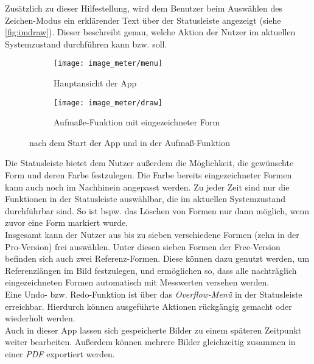 Zusätzlich zu dieser Hilfestellung, wird dem Benutzer beim Auswählen des Zeichen-Modus ein erklärender Text über der Statusleiste angezeigt (siehe \autoref{fig:imdraw}).
Dieser beschreibt genau, welche Aktion der Nutzer im aktuellen Systemzustand durchführen kann bzw. soll. \\

\begin{figure}[h]
  \centering
  \begin{subfigure}[t]{0.49\textwidth}
    \texttt{[image: image\_meter/menu]}
    \caption{Hauptansicht der App}
    \label{fig:immenu}	
  \end{subfigure}
  \begin{subfigure}[t]{0.49\textwidth}
    \texttt{[image: image\_meter/draw]}
    \caption{Aufmaße-Funktion mit eingezeichneter Form} 
    \label{fig:imdraw}	
  \end{subfigure}
  \caption{\im{} nach dem Start der App und in der Aufmaß-Funktion}
\end{figure}

\noindent
Die Statusleiste bietet dem Nutzer außerdem die Möglichkeit, die gewünschte Form und deren Farbe festzulegen.
Die Farbe bereits eingezeichneter Formen kann auch noch im Nachhinein angepasst werden.
Zu jeder Zeit sind nur die Funktionen in der Statusleiste auswählbar, die im aktuellen Systemzustand durchführbar sind.
So ist bspw. das Löschen von Formen nur dann möglich, wenn zuvor eine Form markiert wurde. \\

Insgesamt kann der Nutzer aus bis zu sieben verschiedene Formen (zehn in der Pro-Version) frei auswählen.
Unter diesen sieben Formen der Free-Version befinden sich auch zwei Referenz-Formen.
Diese können dazu genutzt werden, um Referenzlängen im Bild festzulegen, und ermöglichen so, dass alle nachträglich eingezeichneten Formen automatisch mit Messwerten versehen werden. \\

Eine Undo- bzw. Redo-Funktion ist über das \emph{Overflow-Menü} in der Statusleiste erreichbar.
Hierdurch können ausgeführte Aktionen rückgängig gemacht oder wiederholt werden. \\

Auch in dieser App lassen sich gespeicherte Bilder zu einem späteren Zeitpunkt weiter bearbeiten.
Außerdem können mehrere Bilder gleichzeitig zusammen in einer \emph{PDF} exportiert werden.

